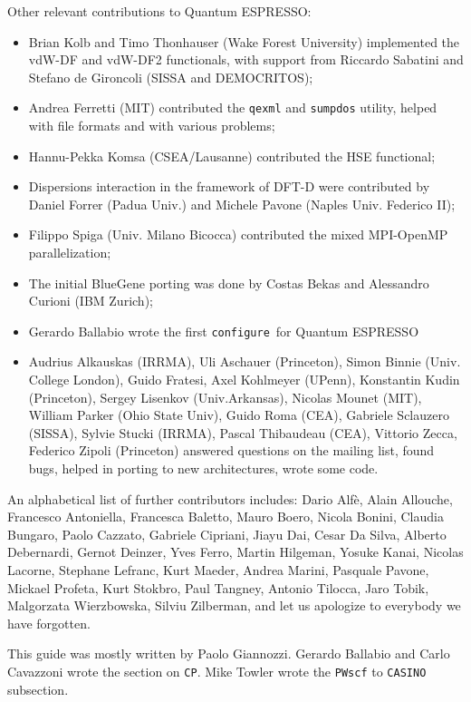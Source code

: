 \documentclass[12pt,a4paper]{article}
\def\qe{{\sc Quantum ESPRESSO}}
\def\configure{\texttt{configure}}
\def\CP{\texttt{CP}}
\begin{document}
Other relevant contributions to \qe:
\begin{itemize}
  \item Brian Kolb and Timo Thonhauser (Wake Forest University)
  implemented the vdW-DF and vdW-DF2 functionals, with support from
  Riccardo Sabatini and Stefano de Gironcoli (SISSA and DEMOCRITOS);
  \item Andrea Ferretti (MIT) contributed the \texttt{qexml} and
  \texttt{sumpdos} utility,
  helped with file formats and with various problems;
  \item Hannu-Pekka Komsa (CSEA/Lausanne) contributed
  the HSE functional;
  \item Dispersions interaction in the framework of DFT-D were
  contributed by Daniel Forrer (Padua Univ.) and Michele Pavone
  (Naples Univ. Federico II);
 \item Filippo Spiga (Univ. Milano Bicocca) contributed the
  mixed MPI-OpenMP parallelization;
  \item The initial BlueGene porting was done by Costas Bekas and
  Alessandro Curioni (IBM Zurich);
  \item Gerardo Ballabio wrote the first \configure\ for \qe
  \item Audrius Alkauskas (IRRMA), Uli Aschauer (Princeton),
Simon Binnie (Univ. College London), Guido Fratesi, Axel Kohlmeyer (UPenn),
Konstantin Kudin (Princeton), Sergey Lisenkov (Univ.Arkansas), 
Nicolas Mounet (MIT), William Parker (Ohio State Univ), 
Guido Roma (CEA), Gabriele Sclauzero (SISSA), Sylvie Stucki (IRRMA), 
Pascal Thibaudeau (CEA), Vittorio Zecca, Federico Zipoli (Princeton)
answered questions on the mailing list, found bugs, helped in 
porting to new architectures, wrote some code.
\end{itemize}

An alphabetical list of further contributors includes: Dario Alf\`e, 
Alain Allouche, Francesco Antoniella, Francesca Baletto,
Mauro Boero, Nicola Bonini, Claudia Bungaro, 
Paolo Cazzato, Gabriele Cipriani, Jiayu Dai, Cesar Da Silva, 
Alberto Debernardi, Gernot Deinzer, Yves Ferro,
Martin Hilgeman,  Yosuke Kanai, Nicolas Lacorne, Stephane Lefranc,
Kurt Maeder, Andrea Marini, 
Pasquale Pavone,  Mickael Profeta, Kurt Stokbro, 
Paul Tangney, 
Antonio Tilocca, Jaro Tobik, 
Malgorzata Wierzbowska, Silviu Zilberman, 
and let us apologize to everybody we have forgotten.
 
This guide was mostly written by Paolo Giannozzi.
Gerardo Ballabio and Carlo Cavazzoni wrote the section on \CP. Mike Towler
wrote the \texttt{PWscf} to \texttt{CASINO} subsection.
\end{document}
